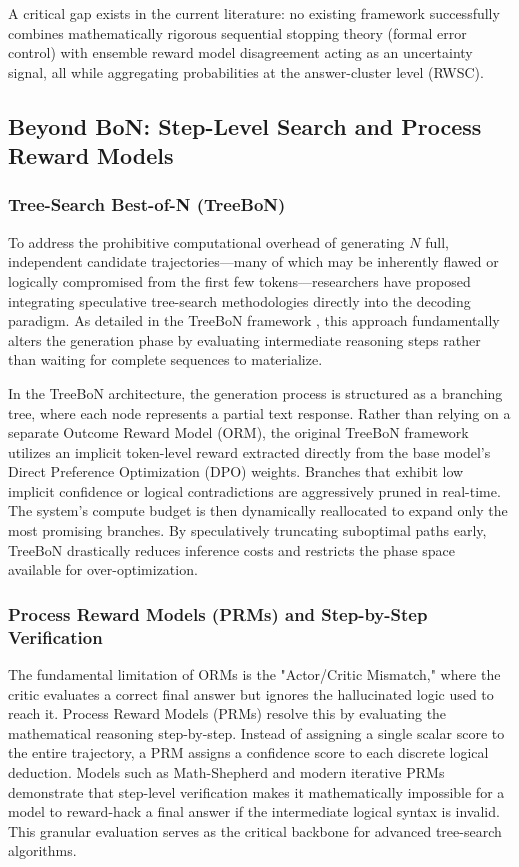 \documentclass[a4paper,11pt]{article}
\begin{document}
A critical gap exists in the current literature: no existing framework successfully combines mathematically rigorous sequential stopping theory (formal error control) with ensemble reward model disagreement acting as an uncertainty signal, all while aggregating probabilities at the answer-cluster level (RWSC).


\subsection{Beyond BoN: Step-Level Search and Process Reward Models}

\subsubsection{Tree-Search Best-of-N (TreeBoN)}
To address the prohibitive computational overhead of generating $N$ full, independent candidate trajectories—many of which may be inherently flawed or logically compromised from the first few tokens—researchers have proposed integrating speculative tree-search methodologies directly into the decoding paradigm. As detailed in the TreeBoN framework \cite{qiu2024treebon}, this approach fundamentally alters the generation phase by evaluating intermediate reasoning steps rather than waiting for complete sequences to materialize.

In the TreeBoN architecture, the generation process is structured as a branching tree, where each node represents a partial text response. Rather than relying on a separate Outcome Reward Model (ORM), the original TreeBoN framework utilizes an implicit token-level reward extracted directly from the base model's Direct Preference Optimization (DPO) weights. Branches that exhibit low implicit confidence or logical contradictions are aggressively pruned in real-time. The system's compute budget is then dynamically reallocated to expand only the most promising branches. By speculatively truncating suboptimal paths early, TreeBoN drastically reduces inference costs and restricts the phase space available for over-optimization.

\subsubsection{Process Reward Models (PRMs) and Step-by-Step Verification}
The fundamental limitation of ORMs is the "Actor/Critic Mismatch," where the critic evaluates a correct final answer but ignores the hallucinated logic used to reach it. Process Reward Models (PRMs) resolve this by evaluating the mathematical reasoning step-by-step. Instead of assigning a single scalar score to the entire trajectory, a PRM assigns a confidence score to each discrete logical deduction. Models such as Math-Shepherd \cite{wang2023mathshepherd} and modern iterative PRMs demonstrate that step-level verification makes it mathematically impossible for a model to reward-hack a final answer if the intermediate logical syntax is invalid. This granular evaluation serves as the critical backbone for advanced tree-search algorithms.
\end{document}
